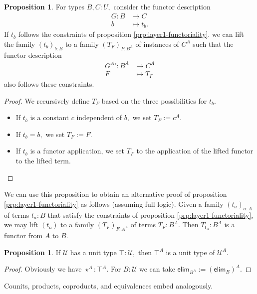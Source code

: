 \documentclass[a4paper]{article}
\theoremstyle{definition}
\newtheorem{proposition}[definition]{Proposition}
\theoremstyle{remark}
\newcommand{\U}{\mathcal{U}}
\newcommand{\nm}{\mathsf}
\newcommand{\elim}{\nm{elim}}
\newcommand{\combinator}{\nm}
\newcommand{\idFun}{\combinator{I}}
\begin{document}
\begin{proposition}
  For types $B,C : U,$ consider the functor description
  \begin{align*}
    G : B &\to     C\\
        b &\mapsto t_b.
  \end{align*}
  If $t_b$ follows the constraints of proposition \ref{prp:layer1-functoriality}. we can lift the
  family $(t_b)_{b : B}$ to a family $(T_F)_{F : B^A}$ of instances of $C^A$ such that the functor
  description
  \begin{align*}
    {G^A}' : B^A &\to     C^A\\
             F   &\mapsto T_F
  \end{align*}
  also follows these constraints.
\end{proposition}

\begin{proof}
  We recursively define $T_F$ based on the three possibilities for $t_b.$
  \begin{itemize}
    \item If $t_b$ is a constant $c$ independent of $b,$ we set $T_F := c^A.$
    \item If $t_b = b,$ we set $T_F := F.$
    \item If $t_b$ is a functor application, we set $T_F$ to the application of
    the lifted functor to the lifted term. \qedhere
  \end{itemize}
\end{proof}

We can use this proposition to obtain an alternative proof of proposition
\ref{prp:layer1-functoriality} as follows (assuming full logic).
Given a family $(t_a)_{a : A}$ of terms $t_a : B$ that satisfy the constraints of proposition
\ref{prp:layer1-functoriality}, we may lift $(t_a)$ to a family $(T_F)_{F : A^A}$ of terms
$T_F : B^A.$ Then $T_{\idFun_A} : B^A$ is a functor from $A$ to $B.$

\begin{proposition}
  If $\U$ has a unit type $\top : \U,$ then $\top^A$ is a unit type of $\U^A.$
\end{proposition}
\vspace{-1ex}
\begin{proof}
  Obviously we have $\star^A : \top^A.$ For $B : \U$ we can take $\elim_{B^A} := (\elim_B)^A.$
\end{proof}

Counits, products, coproducts, and equivalences embed analogously.
\end{document}
